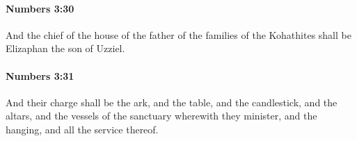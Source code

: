 		\paragraph{Numbers 3:30} %
			\label{NUMBERS-3-30}

			And the chief of the house of the father of the families of the Kohathites shall be Elizaphan the son of Uzziel.


		\paragraph{Numbers 3:31} %
			\label{NUMBERS-3-31}

			And their charge shall be the ark, and the table, and the candlestick, and the altars, and the vessels of the sanctuary wherewith they minister, and the hanging, and all the service thereof.


